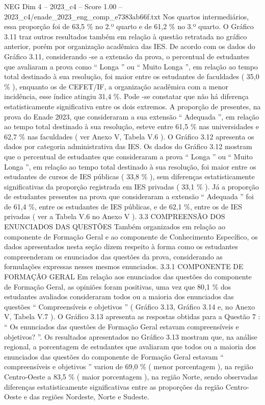 \begin{textsample}{NEG Dim 4 – 2023\_c4 – Score 1.00 – 2023\_c4/enade\_2023\_eng\_comp\_e7383ab66f.txt}
Nos quartos intermediários, essa proporção foi de 63,5 \% no 2.º quarto e de 61,2 \% no 3.º quarto.
O Gráfico 3.11 traz outros resultados também em relação à questão retratada no gráfico anterior, porém por organização acadêmica das IES.
De acordo com os dados do Gráfico 3.11, considerando -se a extensão da prova, o percentual de estudantes que avaliaram a prova como “ Longa ” ou “ Muito Longa ”, em relação ao tempo total destinado à sua resolução, foi maior entre os estudantes de faculdades ( 35,0 \% ), enquanto os de CEFET/IF, a organização acadêmica com a menor incidência, esse índice atingiu 31,4 \%.
Pode -se constatar que não há diferença estatisticamente significativa entre os dois extremos.
A proporção de presentes, na prova do Enade 2023, que consideraram a sua extensão “ Adequada ”, em relação ao tempo total destinado à sua resolução, esteve entre 61,5 \% nas universidades e 62,7 \% nas faculdades ( ver Anexo V, Tabela V.6 ).
O Gráfico 3.12 apresenta os dados por categoria administrativa das IES.
Os dados do Gráfico 3.12 mostram que o percentual de estudantes que consideraram a prova “ Longa ” ou “ Muito Longa ”, em relação ao tempo total destinado à sua resolução, foi maior entre os estudantes de cursos de IES públicas ( 33,8 \% ), sem diferenças estatisticamente significativas da proporção registrada em IES privadas ( 33,1 \% ).
Já a proporção de estudantes presentes na prova que consideraram a extensão “ Adequada ” foi de 61,4 \%, entre os estudantes de IES públicas, e de 62,1 \%, entre os de IES privadas ( ver a Tabela V.6 no Anexo V ). 3.3 COMPREENSÃO DOS ENUNCIADOS DAS QUESTÕES Também organizados em relação ao componente de Formação Geral e ao componente de Conhecimento Específico, os dados apresentados nesta seção dizem respeito à forma como os estudantes compreenderam os enunciados das questões da prova, considerando as formulações expressas nesses mesmos enunciados. 3.3.1 COMPONENTE DE FORMAÇÃO GERAL Em relação aos enunciados das questões do componente de Formação Geral, as opiniões foram positivas, uma vez que 80,1 \% dos estudantes avaliados consideraram todos ou a maioria dos enunciados das questões “ Compreensíveis e objetivos ” ( Gráfico 3.13, Gráfico 3.14 e, no Anexo V, Tabela V.7 ).
O Gráfico 3.13 apresenta as respostas obtidas para a Questão 7 : “ Os enunciados das questões de Formação Geral estavam compreensíveis e objetivos? ”.
Os resultados apresentados no Gráfico 3.13 mostram que, na análise regional, a porcentagem de estudantes que avaliaram que todos ou a maioria dos enunciados das questões do componente de Formação Geral estavam “ compreensíveis e objetivos ” variou de 69,0 \% ( menor porcentagem ), na região Centro-Oeste a 83,5 \% ( maior porcentagem ), na região Norte, sendo observadas diferenças estatisticamente significativas entre as proporções da região Centro-Oeste e das regiões Nordeste, Norte e Sudeste.

\end{textsample}
